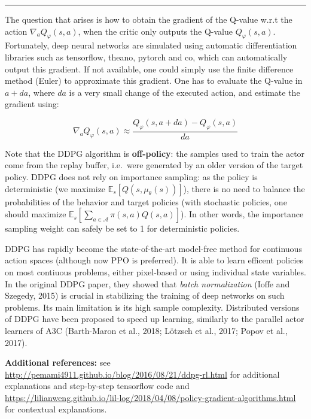 \documentclass[
  letterpaper,
  DIV=11,
  numbers=noendperiod]{scrreprt}
\begin{document}
\begin{center}\rule{0.5\linewidth}{0.5pt}\end{center}

The question that arises is how to obtain the gradient of the Q-value
w.r.t the action \(\nabla_a Q_\varphi(s, a)\), when the critic only
outputs the Q-value \(Q_\varphi(s, a)\). Fortunately, deep neural
networks are simulated using automatic differentiation libraries such as
tensorflow, theano, pytorch and co, which can automatically output this
gradient. If not available, one could simply use the finite difference
method (Euler) to approximate this gradient. One has to evaluate the
Q-value in \(a +da\), where \(da\) is a very small change of the
executed action, and estimate the gradient using:

\[
    \nabla_a Q_\varphi(s, a) \approx \frac{Q_\varphi(s, a + da) - Q_\varphi(s, a)}{da}
\]

Note that the DDPG algorithm is \textbf{off-policy}: the samples used to
train the actor come from the replay buffer, i.e.~were generated by an
older version of the target policy. DDPG does not rely on importance
sampling: as the policy is deterministic (we maximize
\(\mathbb{E}_{s}[Q(s, \mu_\theta(s))]\)), there is no need to balance
the probabilities of the behavior and target policies (with stochastic
policies, one should maximize
\(\mathbb{E}_{s}[\sum_{a\in\mathcal{A}} \pi(s, a) Q(s, a)]\)). In other
words, the importance sampling weight can safely be set to 1 for
deterministic policies.

DDPG has rapidly become the state-of-the-art model-free method for
continuous action spaces (although now PPO is preferred). It is able to
learn efficent policies on most contiuous problems, either pixel-based
or using individual state variables. In the original DDPG paper, they
showed that \emph{batch normalization} (Ioffe and Szegedy, 2015) is
crucial in stabilizing the training of deep networks on such problems.
Its main limitation is its high sample complexity. Distributed versions
of DDPG have been proposed to speed up learning, similarly to the
parallel actor learners of A3C (Barth-Maron et al., 2018; Lötzsch et
al., 2017; Popov et al., 2017).

\textbf{Additional references:} see
\url{http://pemami4911.github.io/blog/2016/08/21/ddpg-rl.html} for
additional explanations and step-by-step tensorflow code and
\url{https://lilianweng.github.io/lil-log/2018/04/08/policy-gradient-algorithms.html}
for contextual explanations.
\end{document}
